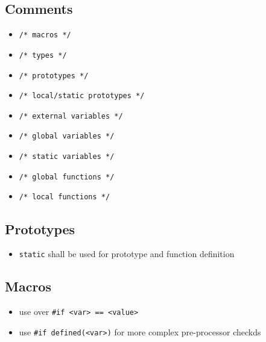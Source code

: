 \subsection{Comments}
	\begin{itemize}
		\item \lstinline{/* macros */}
		\item \lstinline{/* types */}
		\item \lstinline{/* prototypes */}
		\item \lstinline{/* local/static prototypes */}
		\item \lstinline{/* external variables */}
		\item \lstinline{/* global variables */}
		\item \lstinline{/* static variables */}
		\item \lstinline{/* global functions */}
		\item \lstinline{/* local functions */}
	\end{itemize}
	
\subsection{Prototypes}
	\begin{itemize}
		\item \lstinline{static} shall be used for prototype and function definition
	\end{itemize}

\subsection{Macros}
	\begin{itemize}
		\item use  over \lstinline{#if <var> == <value>}
		\item use \lstinline{#if defined(<var>)} for more complex pre-processor checkds
	\end{itemize}
